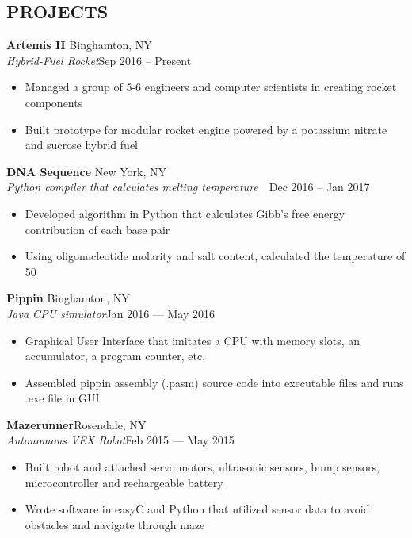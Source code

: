 \documentclass[10pt]{article}
\begin{document}
\subsection*{PROJECTS}
\spacedhrule{-0.1em}{0.9em}

\textbf{Artemis II} \hfill Binghamton, NY \\
\textit{Hybrid-Fuel Rocket}\hfill Sep 2016 – Present
\begin{itemize}
	\item Managed a group of 5-6 engineers and computer scientists in creating rocket components
	\item Built prototype for modular rocket engine powered by a potassium nitrate and sucrose hybrid fuel
\end{itemize}

\textbf{DNA Sequence} \hfill New York, NY \\
\textit{Python compiler that calculates melting temperature}  \hfill Dec 2016 – Jan 2017                             
\begin{itemize}
	\item Developed algorithm in Python that calculates Gibb’s free energy contribution of each base pair
	\item Using oligonucleotide molarity and salt content, calculated the temperature of 50%
\end{itemize}

\textbf{Pippin} \hfill Binghamton, NY \\
\textit{Java CPU simulator}\hfill Jan 2016 — May 2016                           
\begin{itemize}
	\item Graphical User Interface that imitates a CPU with memory slots, an accumulator, a program counter, etc.
	\item Assembled pippin assembly (.pasm) source code into executable files and runs .exe file in GUI
\end{itemize}

\textbf{Mazerunner}\hfill  Rosendale, NY    \\
\textit{Autonomous VEX Robot}\hfill Feb 2015 — May 2015
\begin{itemize}
	\item Built robot and attached servo motors, ultrasonic sensors, bump sensors, microcontroller and rechargeable battery
	\item Wrote software in easyC and Python that utilized sensor data to avoid obstacles and navigate through maze
\end{itemize}
\end{document}
